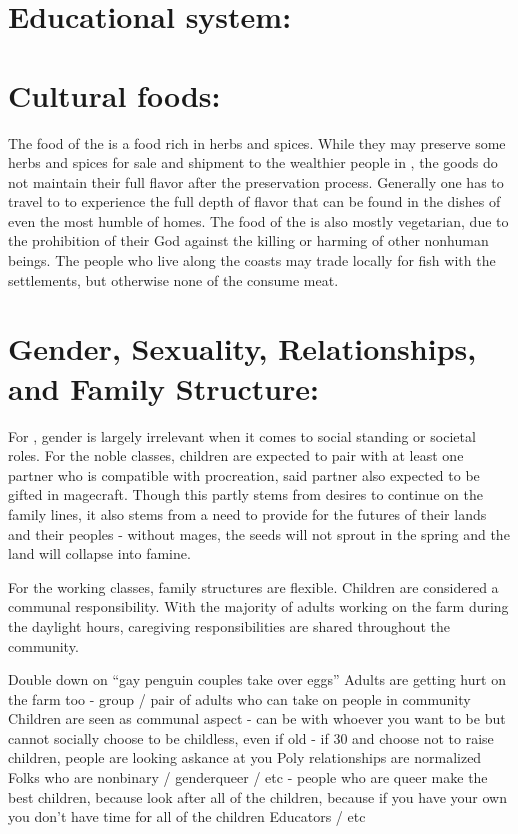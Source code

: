\documentclass[blue]{GL2020}
\begin{document}
\section*{Educational system:}

\section*{Cultural foods:}

The food of the \pSunCh{} is a food rich in herbs and spices.  While they may preserve some herbs and spices for sale and shipment to the wealthier people in \pCreators{}, the goods do not maintain their full flavor after the preservation process.  Generally one has to travel to \pSun{} to experience the full depth of flavor that can be found in the dishes of even the most humble of homes.  The food of the \pSunCh{} is also mostly vegetarian, due to the prohibition of their God against the killing or harming of other nonhuman beings.  The people who live along the coasts may trade locally for fish with the \pVikings{} settlements, but otherwise none of the \pSunCh{} consume meat.

\section*{Gender, Sexuality, Relationships, and Family Structure:}

For \pSunCh{}, gender is largely irrelevant when it comes to social standing or societal roles.  For the noble classes, children are expected to pair with at least one partner who is compatible with procreation, said partner also expected to be gifted in magecraft.  Though this partly stems from desires to continue on the family lines, it also stems from a need to provide for the futures of their lands and their peoples - without mages, the seeds will not sprout in the spring and the land will collapse into famine.  

For the working classes, family structures are flexible.  Children are considered a communal responsibility.  With the majority of adults working on the farm during the daylight hours, caregiving responsibilities are shared throughout the community.     



Double down on “gay penguin couples take over eggs”
Adults are getting hurt on the farm too - group / pair of adults who can take on people in community
Children are seen as communal aspect - can be with whoever you want to be but cannot socially choose to be childless, even if old - if 30 and choose not to raise children, people are looking askance at you
Poly relationships are normalized
Folks who are nonbinary / genderqueer / etc - people who are queer make the best children, because look after all of the children, because if you have your own you don’t have time for all of the children
Educators / etc
\end{document}
